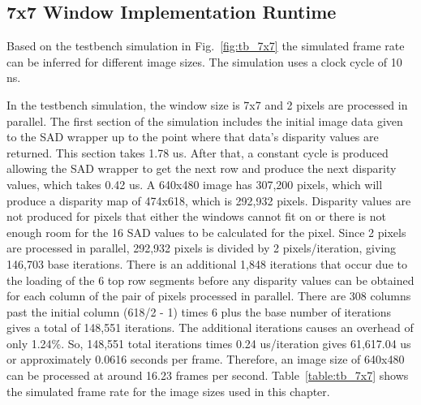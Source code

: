 \subsection{7x7 Window Implementation Runtime}
\label{sec:testbench7x7}

Based on the testbench simulation in Fig.~\ref{fig:tb_7x7} the simulated frame rate can be inferred for different image sizes. The simulation uses a clock cycle of 10 ns.

In the testbench simulation, the window size is 7x7 and 2 pixels are processed in parallel. The first section of the simulation includes the initial image data given to the SAD wrapper up to the point where that data's disparity values are returned. This section takes 1.78 us. After that, a constant cycle is produced allowing the SAD wrapper to get the next row and produce the next disparity values, which takes 0.42 us. A 640x480 image has 307,200 pixels, which will produce a disparity map of 474x618, which is 292,932 pixels. Disparity values are not produced for pixels that either the windows cannot fit on or there is not enough room for the 16 SAD values to be calculated for the pixel. Since 2 pixels are processed in parallel, 292,932 pixels is divided by 2 pixels/iteration, giving 146,703 base iterations. There is an additional 1,848 iterations that occur due to the loading of the 6 top row segments  before any disparity values can be obtained for each column of the pair of pixels processed in parallel. There are 308 columns past the initial column (618/2 - 1) times 6 plus the base number of iterations gives a total of 148,551 iterations. The additional iterations causes an overhead of only 1.24\%. So, 148,551 total iterations times 0.24 us/iteration gives 61,617.04 us or approximately 0.0616 seconds per frame. Therefore, an image size of 640x480 can be processed at around 16.23 frames per second. Table~\ref{table:tb_7x7} shows the simulated frame rate for the image sizes used in this chapter.



